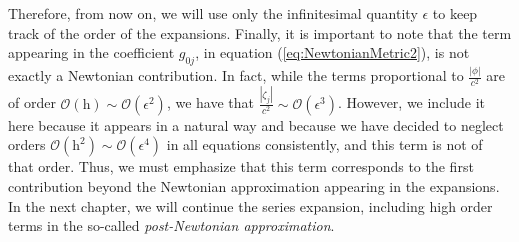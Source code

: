 Therefore, from now on, we will use only the infinitesimal quantity $\epsilon$ to keep track of the order of the expansions.  Finally, it is important to note that the term appearing in the coefficient $g_{0j}$, in equation (\ref{eq:NewtonianMetric2}), is not exactly a Newtonian contribution. In fact, while the terms proportional to  $\frac{\left| \phi \right|}{c^2}$ are of order $\mathcal{O} ( \textrm{h} ) \sim \mathcal{O}(\epsilon^2)$, we have that $ \frac{\left| \zeta_j \right|}{c^2} \sim \mathcal{O} ( \epsilon^{3} )$. However, we include it here because it appears in a natural way and because we have decided to neglect orders $\mathcal{O} ( \textrm{h}^2 ) \sim \mathcal{O}(\epsilon^4)$ in all equations consistently, and this term is not of that order. Thus, we must emphasize that this term corresponds to the first contribution beyond the Newtonian approximation appearing in the expansions. In the next chapter, we will continue the series expansion, including high order terms in the so-called \textit{post-Newtonian approximation}.




